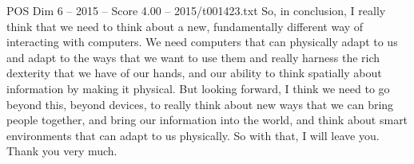 \begin{textsample}{POS Dim 6 – 2015 – Score 4.00 – 2015/t001423.txt}
So, in conclusion, I really think that we need to think about a new, fundamentally different way of interacting with computers.
We need computers that can physically adapt to us and adapt to the ways that we want to use them and really harness the rich dexterity that we have of our hands, and our ability to think spatially about information by making it physical.
But looking forward, I think we need to go beyond this, beyond devices, to really think about new ways that we can bring people together, and bring our information into the world, and think about smart environments that can adapt to us physically.
So with that, I will leave you.
Thank you very much.

\end{textsample}
